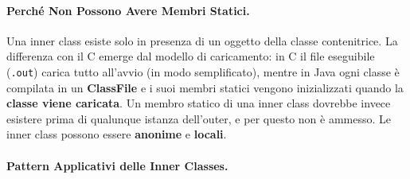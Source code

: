 \documentclass[12pt]{extarticle}
\begin{document}
\paragraph{Perché Non Possono Avere Membri Statici.}
Una inner class esiste solo in presenza di un oggetto della classe contenitrice. La differenza con il C emerge dal modello di caricamento: in C il file eseguibile (\texttt{.out}) carica tutto all'avvio (in modo semplificato), mentre in Java ogni classe è compilata in un \textbf{ClassFile} e i suoi membri statici vengono inizializzati quando la \textbf{classe viene caricata}. Un membro statico di una inner class dovrebbe invece esistere prima di qualunque istanza dell'outer, e per questo non è ammesso. Le inner class possono essere \textbf{anonime} e \textbf{locali}.

\paragraph{Pattern Applicativi delle Inner Classes.}
\end{document}

